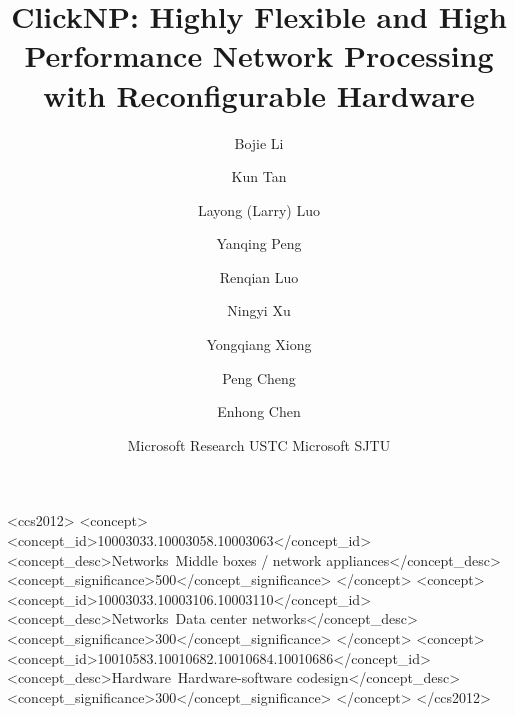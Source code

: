 \documentclass[10pt,pdfletax,letterpaper]{sig-alternate-05-2015}
\begin{document}


\title{ClickNP: Highly Flexible and High Performance Network Processing with Reconfigurable Hardware\vspace{-0.8cm}}
\def\name{ClickNP}
\def\fullname{Click Network Processor}
\def\sysname{}


\newcommand{\authornote}[1]{\raisebox{0.8ex}{$#1$}}

\author{
	Bojie Li\authornote{\S\dagger} \and
	Kun Tan\authornote{\dagger} \and
	Layong (Larry) Luo\authornote{\ddagger} \and
	Yanqing Peng\authornote{\bullet\dagger} \and
	Renqian Luo\authornote{\S\dagger} \and
	Ningyi Xu\authornote{\dagger} \and
	Yongqiang Xiong\authornote{\dagger} \and
	Peng Cheng\authornote{\dagger} \and
	Enhong Chen\authornote{\S} \and
	\authornote{\dagger}Microsoft Research \quad
	\authornote{\S}USTC \quad
	\authornote{\ddagger}Microsoft \quad
	\authornote{\bullet}SJTU
}

\maketitle

%
%
\begin{CCSXML}
	<ccs2012>
	<concept>
	<concept_id>10003033.10003058.10003063</concept_id>
	<concept_desc>Networks~Middle boxes / network appliances</concept_desc>
	<concept_significance>500</concept_significance>
	</concept>
	<concept>
	<concept_id>10003033.10003106.10003110</concept_id>
	<concept_desc>Networks~Data center networks</concept_desc>
	<concept_significance>300</concept_significance>
	</concept>
	<concept>
	<concept_id>10010583.10010682.10010684.10010686</concept_id>
	<concept_desc>Hardware~Hardware-software codesign</concept_desc>
	<concept_significance>300</concept_significance>
	</concept>
	</ccs2012>
\end{CCSXML}
\end{document}

